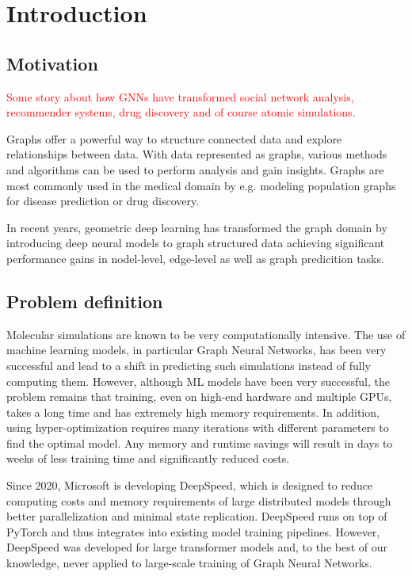 \section{Introduction}

\subsection{Motivation}

\textcolor{red}{Some story about how GNNs have transformed social network analysis, recommender systems, drug discovery and of course 
atomic simulations.}

Graphs offer a powerful way to structure connected data and explore relationships between data. With data represented 
as graphs, various methods and algorithms can be used to perform analysis and gain insights. Graphs are most commonly 
used in the medical domain by e.g. modeling population graphs for disease prediction or drug discovery.

In recent years, geometric deep learning has transformed the graph domain by introducing deep neural models to graph 
structured data achieving significant performance gains in nodel-level, edge-level as well as graph predicition tasks. 


\subsection{Problem definition}

Molecular simulations are known to be very computationally intensive. The use of machine learning models, in particular 
Graph Neural Networks, has been very successful and lead to a shift in predicting such simulations instead of 
fully computing them. However, although ML models have been very successful, the problem remains that training, 
even on high-end hardware and multiple GPUs, takes a long time and has extremely high memory requirements. In 
addition, using hyper-optimization requires many iterations with different parameters to find the optimal model. 
Any memory and runtime savings will result in days to weeks of less training time and significantly reduced costs.

Since 2020, Microsoft is developing DeepSpeed, which is designed to reduce computing costs and memory 
requirements of large distributed models through better parallelization and minimal state replication. DeepSpeed 
runs on top of PyTorch and thus integrates into existing model training pipelines. However, DeepSpeed was developed 
for large transformer models and, to the best of our knowledge, never applied to large-scale training of Graph Neural Networks.

